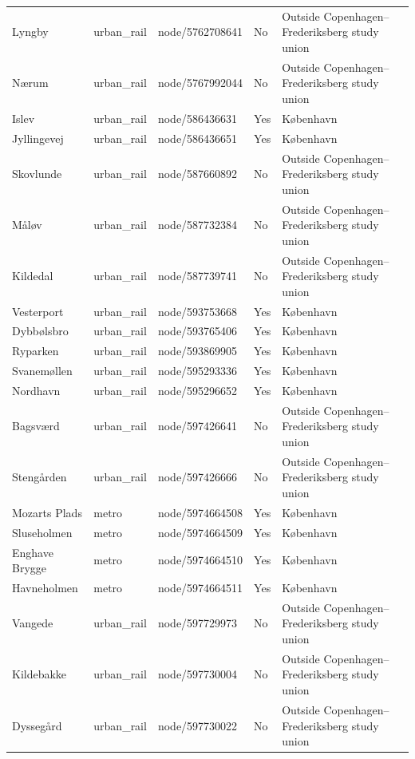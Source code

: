 \begin{landscape}
\begin{longtable}{>{\raggedright\arraybackslash}p{8.0cm}>{\raggedright\arraybackslash}p{2.4cm}>{\raggedright\arraybackslash}p{3.7cm}>{\raggedright\arraybackslash}p{1.5cm}>{\raggedright\arraybackslash}p{5.2cm}}
Lyngby & urban\_\allowbreak{}rail & node/5762708641 & No & Outside Copenhagen--Frederiksberg study union \\
Nærum & urban\_\allowbreak{}rail & node/5767992044 & No & Outside Copenhagen--Frederiksberg study union \\
Islev & urban\_\allowbreak{}rail & node/586436631 & Yes & København \\
Jyllingevej & urban\_\allowbreak{}rail & node/586436651 & Yes & København \\
Skovlunde & urban\_\allowbreak{}rail & node/587660892 & No & Outside Copenhagen--Frederiksberg study union \\
Måløv & urban\_\allowbreak{}rail & node/587732384 & No & Outside Copenhagen--Frederiksberg study union \\
Kildedal & urban\_\allowbreak{}rail & node/587739741 & No & Outside Copenhagen--Frederiksberg study union \\
Vesterport & urban\_\allowbreak{}rail & node/593753668 & Yes & København \\
Dybbølsbro & urban\_\allowbreak{}rail & node/593765406 & Yes & København \\
Ryparken & urban\_\allowbreak{}rail & node/593869905 & Yes & København \\
Svanemøllen & urban\_\allowbreak{}rail & node/595293336 & Yes & København \\
Nordhavn & urban\_\allowbreak{}rail & node/595296652 & Yes & København \\
Bagsværd & urban\_\allowbreak{}rail & node/597426641 & No & Outside Copenhagen--Frederiksberg study union \\
Stengården & urban\_\allowbreak{}rail & node/597426666 & No & Outside Copenhagen--Frederiksberg study union \\
Mozarts Plads & metro & node/5974664508 & Yes & København \\
Sluseholmen & metro & node/5974664509 & Yes & København \\
Enghave Brygge & metro & node/5974664510 & Yes & København \\
Havneholmen & metro & node/5974664511 & Yes & København \\
Vangede & urban\_\allowbreak{}rail & node/597729973 & No & Outside Copenhagen--Frederiksberg study union \\
Kildebakke & urban\_\allowbreak{}rail & node/597730004 & No & Outside Copenhagen--Frederiksberg study union \\
Dyssegård & urban\_\allowbreak{}rail & node/597730022 & No & Outside Copenhagen--Frederiksberg study union \\

\end{longtable}
\end{landscape}
